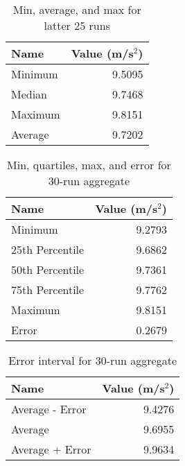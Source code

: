 \newpage
\begin{table}[ht]
    \centering
    \begin{tabular}{|l|r|}
        \hline
        Name & Value (m/s$^{2}$) \\
        \hline
        Minimum & 9.5095 \\
        Median & 9.7468 \\
        Maximum & 9.8151 \\
        Average & 9.7202 \\
        \hline
    \end{tabular}
    \caption{Min, average, and max for latter 25 runs}
    \label{table:01.describe.25}
\end{table}
\begin{table}[ht]
    \centering
    \begin{tabular}{|l|r|}
        \hline
        Name & Value (m/s$^{2}$) \\
        \hline
        Minimum & 9.2793 \\
        25th Percentile & 9.6862 \\
        50th Percentile & 9.7361 \\
        75th Percentile & 9.7762 \\
        Maximum & 9.8151 \\
        Error & 0.2679 \\
        \hline
    \end{tabular}
    \caption{Min, quartiles, max, and error for 30-run aggregate}
    \label{table:01.describe.30}
\end{table}
\begin{table}[ht]
    \centering
    \begin{tabular}{|l|r|}
        \hline
        Name & Value (m/s$^{2}$) \\
        \hline
        Average - Error & 9.4276 \\
        Average & 9.6955 \\
        Average + Error & 9.9634 \\
        \hline
    \end{tabular}
    \caption{Error interval for 30-run aggregate}
    \label{table:01.error.30}
\end{table}
